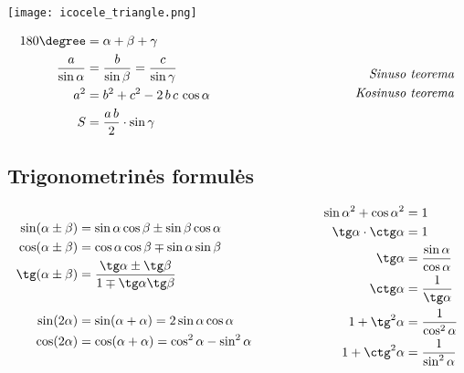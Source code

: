 \texttt{[image: icocele\_triangle.png]}

\begin{equation*}
    \begin{aligned}[c]
        180\degree &= \alpha + \beta + \gamma \\
        \frac{a}{\sin \alpha} &= \frac{b}{\sin \beta} = \frac{c}{\sin \gamma} \\
        a^2 &= b^2 + c^2 - 2\, b\, c\,\cos \alpha \\
        S &= \frac{a\,b}{2} \cdot \sin \gamma
    \end{aligned}
    \hspace{40mm}
    \begin{aligned}[c]
        \textit{Sinuso\ teorema} \\
        \textit{Kosinuso\ teorema} \\
    \end{aligned}
\end{equation*}


\subsection{Trigonometrinės formulės}

\begin{equation*} \\
    \begin{aligned}[c]
        \sin(\alpha \pm \beta) &= \sin\alpha\cos\beta \pm \sin\beta\cos\alpha \\
        \cos(\alpha \pm \beta) &= \cos\alpha\cos\beta \mp \sin\alpha\sin\beta \\
        \tg (\alpha \pm \beta) &= \frac{\tg\alpha \pm \tg\beta}{1 \mp \tg\alpha \tg\beta} \\ \\
        \sin(2\alpha) &= \sin(\alpha + \alpha) = 2\sin\alpha\cos\alpha \\
        \cos(2\alpha) &= \cos(\alpha + \alpha) = \cos^2\alpha - \sin^2\alpha
    \end{aligned}
    \hspace{20mm}
    \begin{aligned}[c]
        \sin{\alpha}^2 + \cos{\alpha}^2 &= 1 \\
        \tg \alpha \cdot \ctg \alpha &= 1 \\
        \tg \alpha &= \frac{\sin \alpha}{\cos \alpha} \\
        \ctg \alpha &= \frac{1}{\tg \alpha} \\
        1 + \tg^2 \alpha &= \frac{1}{\cos^2 \alpha} \\  
        1 + \ctg^2 \alpha &= \frac{1}{\sin^2 \alpha} \\  
    \end{aligned}
\end{equation*}

